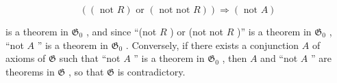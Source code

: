 \[
((\text { not } R) \text { or } (\text { not   not } R)) \Longrightarrow (\text { not } A)
\]

is a theorem in \(\mathfrak{G}_0\) , and since ``(not \(R\) ) or (not not \(R\) )'' is a theorem in \(\mathfrak{G}_0\) , ``not \(A\) '' is a theorem in \(\mathfrak{G}_0\) . Conversely, if there exists a conjunction \(A\) of axioms of \(\mathfrak{G}\) such that ``not \(A\) '' is a theorem in \(\mathfrak{G}_0\) , then \(A\) and ``not \(A\) '' are theorems in \(\mathfrak{G}\) , so that \(\mathfrak{G}\) is contradictory.

